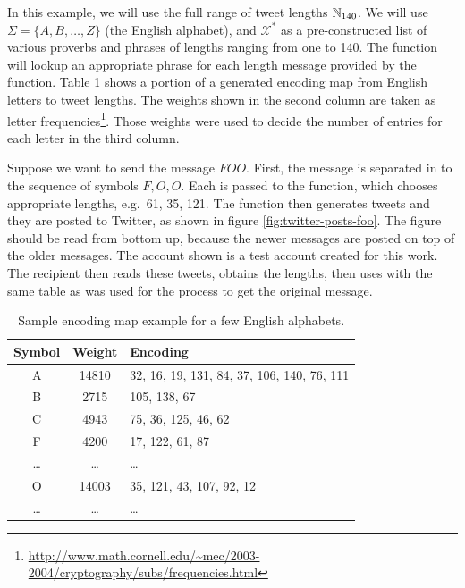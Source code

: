 \begin{example}
In this example, we will use the full range of tweet lengths $\mathbb{N}_{140}$.  We will use
$\Sigma = \{A, B, \ldots, Z\}$ (the English alphabet), and $\mathcal{X}^*$ as a
pre-constructed list of various proverbs and phrases of lengths ranging from one
to 140.  The  function will lookup an appropriate phrase for each
length message provided by the  function.  Table
\ref{tab:real-encode} shows a portion of a generated encoding map from English letters to
tweet lengths.  The weights shown in the second column are taken as letter
frequencies\footnote{\url{http://www.math.cornell.edu/~mec/2003-2004/cryptography/subs/frequencies.html}}.
Those weights were used to decide the number of entries for each letter in the
third column.  

Suppose we want to send the message $FOO$.  First, the message is separated in
to the sequence of symbols $F, O, O$.  Each is passed to the 
function, which chooses appropriate lengths, e.g.\ 61, 35, 121.  The
 function then generates tweets and they are posted to Twitter, as
shown in figure \ref{fig:twitter-posts-foo}.  The figure should be read from
bottom up, because the newer messages are posted on top of the older messages.
The account shown is a test account created for this work.  The recipient then
reads these tweets, obtains the lengths, then uses  with the same
table as was used for the  process to get the original message.
\end{example}

\begin{table}
\centering
\begin{tabular}{|c|c|p{5.2cm}|}
\hline
Symbol & Weight & Encoding \\
\hline
A & 14810 & 32, 16, 19, 131, 84, 37, 106, 140, 76, 111\\
\hline
B & 2715 & 105, 138, 67 \\
\hline
C & 4943 & 75, 36, 125, 46, 62\\
\hline
F & 4200 & 17, 122, 61, 87\\
\hline
 \ldots & \ldots & \ldots \\
\hline
O & 14003 & 35, 121, 43, 107, 92, 12\\
\hline
 \ldots & \ldots & \ldots \\
\hline
\end{tabular}
\caption{Sample encoding map example for a few English alphabets.}
\label{tab:real-encode}
\end{table}

